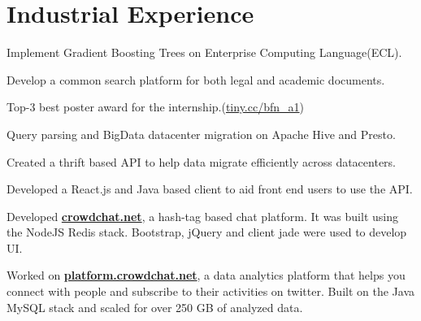 \documentclass[]{bigfatnoob-resume}
\begin{document}
\begin{minipage}[t]{0.66\textwidth} 


\section{Industrial Experience}

\vspace{\topsep} %
\begin{tightemize}
	\item Implement Gradient Boosting Trees on Enterprise Computing Language(ECL).
	\item Develop a common search platform for both legal and academic documents.
	\item Top-3 best poster award for the internship.(\href{https://tiny.cc/bfn_a1}{tiny.cc/bfn\_a1})
\end{tightemize}
\sectionsep

\begin{tightemize}
	\item Query parsing and BigData datacenter migration on Apache Hive and Presto.
	\item Created a thrift based API to help data migrate efficiently across datacenters.
	\item Developed a React.js and Java based client to aid front end users to use the API.
\end{tightemize}
\sectionsep

\begin{tightemize}
	\item Developed \textbf{\href{https://www.crowdchat.net/}{crowdchat.net}}, a hash-tag based chat platform. It was built using the NodeJS Redis stack. Bootstrap, jQuery and client jade were used to develop UI.
	\item Worked on \textbf{\href{https://platform.crowdchat.net}{platform.crowdchat.net}}, a data analytics platform that helps you connect with people and subscribe to their activities on twitter. Built on the Java MySQL stack and scaled for over 250 GB of analyzed data.
\end{tightemize}
\sectionsep


\end{minipage}
\end{document}
